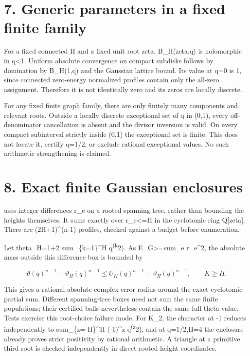 \documentclass[
  11pt,
  a4paper,
]{report}
\let\singularitytexttt\texttt
\renewcommand{\texttt}[1]{\singularitytexttt{\seqsplit{#1}}}
\begin{document}
\hypertarget{generic-parameters-in-a-fixed-finite-family}{%
\section{7. Generic parameters in a fixed finite
family}\label{generic-parameters-in-a-fixed-finite-family}}

For a fixed connected H and a fixed unit root zeta, B\_H(zeta,q) is
holomorphic in \textbar q\textbar\textless1. Uniform absolute
convergence on compact subdisks follows by domination by
B\_H(1,\textbar q\textbar) and the Gaussian lattice bound. Its value at
q=0 is 1, since connected zero-energy normalized profiles contain only
the all-zero assignment. Therefore it is not identically zero and its
zeros are locally discrete.

For any fixed finite graph family, there are only finitely many
components and relevant roots. Outside a locally discrete exceptional
set of q in (0,1), every off-denominator cancellation is absent and the
divisor inversion is valid. On every compact subinterval strictly inside
(0,1) the exceptional set is finite. This does not locate it, certify
q=1/2, or exclude rational exceptional values. No such arithmetic
strengthening is claimed.

\hypertarget{exact-finite-gaussian-enclosures}{%
\section{8. Exact finite Gaussian
enclosures}\label{exact-finite-gaussian-enclosures}}

\texttt{anchored\_gaussian\_box} uses integer differences r\_e on a
rooted spanning tree, rather than bounding the heights themselves. It
sums exactly over \textbar r\_e\textbar\textless=H in the cyclotomic
ring Q{[}zeta{]}. There are (2H+1)\^{}(n-1) profiles, checked against a
budget before enumeration.

Let theta\_H=1+2 sum\_\{k=1\}\^{}H q\textsuperscript{(k}2). As
E\_G\textgreater=sum\_e r\_e\^{}2, the absolute mass outside this
difference box is bounded by

\[
 \vartheta(q)^{n-1}-\vartheta_H(q)^{n-1}
 \le U_K(q)^{n-1}-\vartheta_H(q)^{n-1},\qquad K\ge H.
\]

This gives a rational absolute complex-error radius around the exact
cyclotomic partial sum. Different spanning-tree boxes need not sum the
same finite populations; their certified balls nevertheless contain the
same full theta value. Tests exercise this root-choice failure mode. For
K\_2, the character at -1 reduces independently to sum\_\{z=-H\}\^{}H
(-1)\^{}z q\textsuperscript{(z}2), and at q=1/2,H=4 the enclosure
already proves strict positivity by rational arithmetic. A triangle at a
primitive third root is checked independently in direct rooted height
coordinates.
\end{document}
